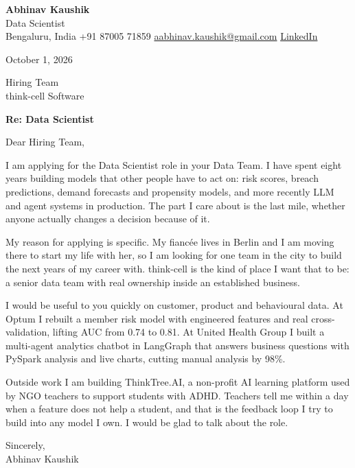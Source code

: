 \documentclass[11pt,a4paper]{article}
\begin{document}
{\Large\bfseries Abhinav Kaushik}\\
Data Scientist\\
Bengaluru, India \textbar{} +91 87005 71859 \textbar{} \href{mailto:aabhinav.kaushik@gmail.com}{aabhinav.kaushik@gmail.com} \textbar{} \href{https://www.linkedin.com/in/abhinav-kaushik10/}{LinkedIn}  

October 1, 2026

Hiring Team\\
think-cell Software

\textbf{Re: Data Scientist}

Dear Hiring Team,

I am applying for the Data Scientist role in your Data Team. I have spent eight years building models that other people have to act on: risk scores, breach predictions, demand forecasts and propensity models, and more recently LLM and agent systems in production. The part I care about is the last mile, whether anyone actually changes a decision because of it.

My reason for applying is specific. My fiancée lives in Berlin and I am moving there to start my life with her, so I am looking for one team in the city to build the next years of my career with. think-cell is the kind of place I want that to be: a senior data team with real ownership inside an established business.

I would be useful to you quickly on customer, product and behavioural data. At Optum I rebuilt a member risk model with engineered features and real cross-validation, lifting AUC from 0.74 to 0.81. At United Health Group I built a multi-agent analytics chatbot in LangGraph that answers business questions with PySpark analysis and live charts, cutting manual analysis by 98\%.

Outside work I am building ThinkTree.AI, a non-profit AI learning platform used by NGO teachers to support students with ADHD. Teachers tell me within a day when a feature does not help a student, and that is the feedback loop I try to build into any model I own. I would be glad to talk about the role.

Sincerely,\\[4pt]
Abhinav Kaushik
\end{document}
